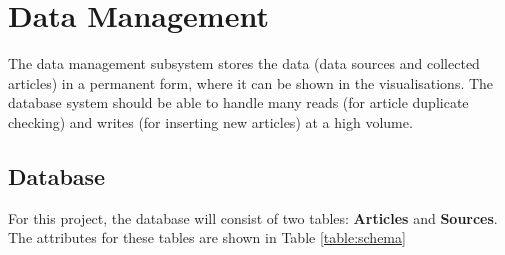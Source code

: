 \documentclass{l4proj}
\begin{document}
\section{Data Management}
The data management subsystem stores the data (data sources and collected articles) in a permanent form, where it can be shown in the visualisations. The database system should be able to handle many reads (for article duplicate checking) and writes (for inserting new articles) at a high volume. 

\subsection{Database}
For this project, the database will consist of two tables: \textbf{Articles} and \textbf{Sources}. The attributes for these tables are shown in Table \ref{table:schema}
\end{document}
